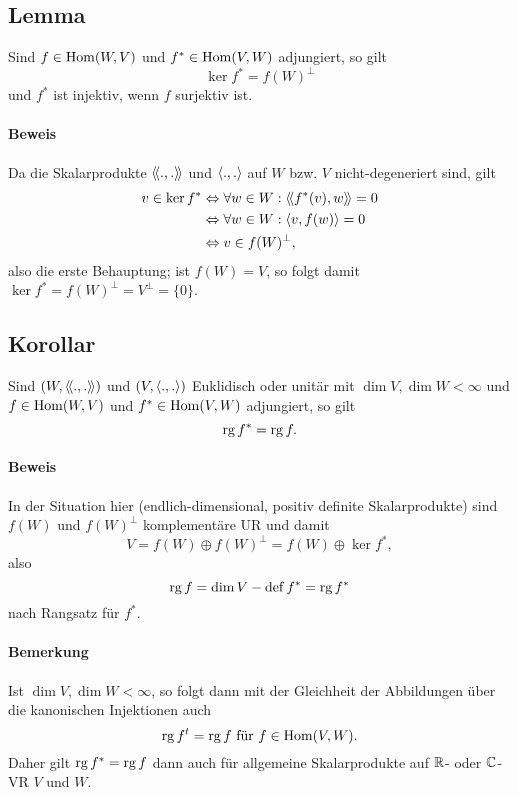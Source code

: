 \subsection{Lemma}\label{fruh}
\begin{Lemma}[]
	Sind $ f\in \operatorname{Hom}(W,V) $ und $ f^*\in \operatorname{Hom}(V,W) $ adjungiert, so gilt
		\[ \ker f^* = f(W)^\perp \]
	und $ f^* $ ist injektiv, wenn $ f $ surjektiv ist.
\end{Lemma}
\paragraph{Beweis}
	Da die Skalarprodukte $ \langle\! \langle .,. \rangle\! \rangle $ und $ \langle .,. \rangle $ auf $ W $ bzw. $ V $ nicht-degeneriert sind, gilt
		\begin{align*}
			v\in \ker f^* &\Leftrightarrow \forall w\in W: \langle\! \langle f^*(v),w \rangle\! \rangle = 0 \\
			&\Leftrightarrow \forall w\in W: \langle v,f(w) \rangle = 0 \\
			&\Leftrightarrow v\in f(W)^\perp,
		\end{align*}
	also die erste Behauptung; ist $ f(W)  = V$, so folgt damit $ \ker f^* = f(W)^\perp = V^\perp = \{0\} $.

\subsection{Korollar}
\begin{Korollar}[]
	Sind $ (W,\langle\! \langle .,. \rangle\! \rangle) $ und $ (V,\langle .,. \rangle) $ Euklidisch oder unitär mit $ \dim V, \dim W < \infty $ und $ f\in \operatorname{Hom}(W,V) $ und $ f^*\in \operatorname{Hom}(V,W) $ adjungiert, so gilt
		\[ \operatorname{rg} f^* = \operatorname{rg} f. \]
\end{Korollar}
\paragraph{Beweis}
	In der Situation hier (endlich-dimensional, positiv definite Skalarprodukte) sind $ f(W) $ und $ f(W)^\perp $ komplementäre UR und damit
		\[ V = f(W)\oplus f(W)^\perp = f(W)\oplus \ker f^*, \]
	also
		\[ \operatorname{rg} f = \dim V-\operatorname{def} f^* = \operatorname{rg} f^* \]
	nach Rangsatz für $ f^* $.
\paragraph{Bemerkung}
	Ist $ \dim V, \dim W <\infty $, so folgt dann mit der Gleichheit der Abbildungen über die kanonischen Injektionen auch
		\[ \operatorname{rg} f^t = \operatorname{rg} f \text{ für } f\in \operatorname{Hom}(V,W). \]
	Daher gilt $ \operatorname{rg} f^* = \operatorname{rg} f $ dann auch für allgemeine Skalarprodukte auf $ \mathbb{R} $- oder $ \mathbb{C} $-VR $ V $ und $ W $.

